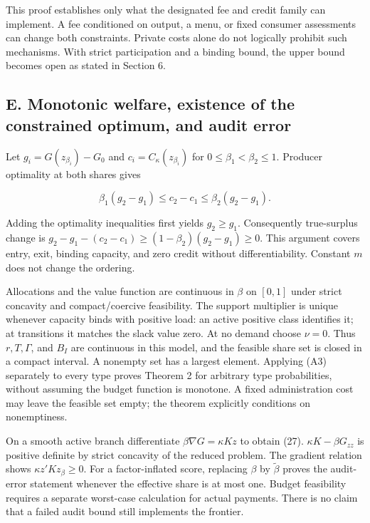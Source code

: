 \documentclass[
  11pt,
]{article}
\begin{document}
This proof establishes only what the designated fee and credit family
can implement. A fee conditioned on output, a menu, or fixed consumer
assessments can change both constraints. Private costs alone do not
logically prohibit such mechanisms. With strict participation and a
binding bound, the upper bound becomes open as stated in Section 6.

\subsection{E. Monotonic welfare, existence of the constrained optimum,
and audit
error}\label{e.-monotonic-welfare-existence-of-the-constrained-optimum-and-audit-error}

Let \(g_i=G(z_{\beta_i})-G_0\) and \(c_i=C_\kappa(z_{\beta_i})\) for
\(0\leq\beta_1<\beta_2\leq1\). Producer optimality at both shares gives

\[\beta_1(g_2-g_1)\leq c_2-c_1\leq\beta_2(g_2-g_1). \tag{A3}\]

Adding the optimality inequalities first yields \(g_2\geq g_1\).
Consequently true-surplus change is
\(g_2-g_1-(c_2-c_1)\geq(1-\beta_2)(g_2-g_1)\geq0\). This argument covers
entry, exit, binding capacity, and zero credit without
differentiability. Constant \(m\) does not change the ordering.

Allocations and the value function are continuous in \(\beta\) on
\([0,1]\) under strict concavity and compact/coercive feasibility. The
support multiplier is unique whenever capacity binds with positive load:
an active positive class identifies it; at transitions it matches the
slack value zero. At no demand choose \(\nu=0\). Thus \(r,T,\Gamma\),
and \(B_I\) are continuous in this model, and the feasible share set is
closed in a compact interval. A nonempty set has a largest element.
Applying (A3) separately to every type proves Theorem 2 for arbitrary
type probabilities, without assuming the budget function is monotone. A
fixed administration cost may leave the feasible set empty; the theorem
explicitly conditions on nonemptiness.

On a smooth active branch differentiate \(\beta\nabla G=\kappa Kz\) to
obtain (27). \(\kappa K-\beta G_{zz}\) is positive definite by strict
concavity of the reduced problem. The gradient relation shows
\(\kappa z'Kz_\beta\geq0\). For a factor-inflated score, replacing
\(\beta\) by \(\widetilde\beta\) proves the audit-error statement
whenever the effective share is at most one. Budget feasibility requires
a separate worst-case calculation for actual payments. There is no claim
that a failed audit bound still implements the frontier.
\end{document}
